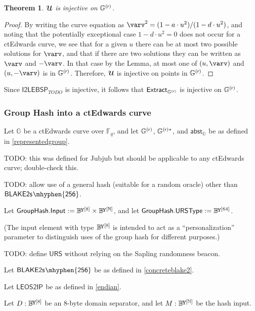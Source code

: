 \documentclass{article}
\newtheorem{theorem}{Theorem}[subsection]
\newcommand{\crossref}[1]{\autoref{#1}}
\newcommand{\typecolon}{:}
\newcommand{\overlap}[2]{\rlap{#2}\hspace{#1}{#2}}
\newcommand{\byte}{\mathbb{B}\kern -0.1em\raisebox{0.48ex}{\overlap{0.0001em}{\scalebox{0.7}{$\mathbb{Y}$}}}}
\newcommand{\Nat}{\mathbb{N}}
\newcommand{\Field}[1]{\mathbb{F}_{\!#1}}
\newcommand{\typeexp}[2]{{#1}\vphantom{)}^{[{#2}]}}
\newcommand{\byteseq}[1]{\typeexp{\byte}{#1}}
\newcommand{\byteseqs}{\byteseq{\Nat}}
\newcommand{\mult}{\cdot}
\newcommand{\BlakeTwos}[1]{\mathsf{BLAKE2s\kern 0.05em\mhyphen{#1}}}
\newcommand{\Selectu}{\scalebox{1.53}{$u$}}
\newcommand{\subgroupr}{(\kern-0.075emr\kern-0.075em)}
\newcommand{\Extract}{\mathsf{Extract}}
\newcommand{\GroupHash}{\mathsf{GroupHash}}
\newcommand{\GroupG}[1]{\mathbb{G}_{#1}}
\newcommand{\SubgroupG}[1]{\GroupG{#1}^{\subgroupr}}
\newcommand{\SubgroupGstar}[1]{\GroupG{#1}^{\subgroupr\ast}}
\newcommand{\abstG}[1]{\abst_{\GroupG{#1}}}
\newcommand{\ExtractG}{\Extract_{\SubgroupG{}}}
\newcommand{\GroupGHashURSType}{\GroupHash\mathsf{.URSType}}
\newcommand{\GroupGHashInput}{\GroupHash\mathsf{.Input}}
\newcommand{\URS}{\mathsf{URS}}
\newcommand{\abst}{\mathsf{abst}}
\newcommand{\ItoLEBSP}[1]{\mathsf{I2LEBSP}_{#1}}
\newcommand{\LEOStoIP}[1]{\mathsf{LEOS2IP}_{#1}}
\begin{document}
\begin{theorem}
$\Selectu$ is injective on $\SubgroupG{}$.
\end{theorem}

\begin{proof}
By writing the curve equation as
$\varv^2 = (1 - a \mult u^2) / (1 - d \mult u^2)$, and noting that the
potentially exceptional case $1 - d \mult u^2 = 0$ does not occur for a
ctEdwards curve, we see that for a given $u$ there can be at
most two possible solutions for $\varv$, and that if there are two solutions
they can be written as $\varv$ and $-\varv$. In that case by the Lemma, at
most one of $(u, \varv)$ and $(u, -\varv)$ is in $\SubgroupG{}$. Therefore,
$\Selectu$ is injective on points in $\SubgroupG{}$.
\end{proof}

Since $\ItoLEBSP{TODO}$ is injective, it follows that $\ExtractG$ is injective
on $\SubgroupG{}$.


\subsubsection{Group Hash into a ctEdwards curve} \label{concreteedwardsgrouphash}

Let $\GroupG{}$ be a ctEdwards curve over $\Field{q}$, and
let $\SubgroupG{}$, $\SubgroupGstar{}$, and $\abstG{}$ be as defined in \crossref{representedgroup}.

TODO: this was defined for Jubjub but should be applicable to any ctEdwards curve;
double-check this.

TODO: allow use of a general hash (suitable for a random oracle) other than
$\BlakeTwos{256}$.

Let $\GroupGHashInput := \byteseq{8} \times \byteseqs$, and
let $\GroupGHashURSType := \byteseq{64}$.

(The input element with type $\byteseq{8}$ is intended to act as a
``personalization'' parameter to distinguish uses of the group hash for
different purposes.)

TODO: define $\URS$ without relying on the Sapling randomness beacon.

Let $\BlakeTwos{256}$ be as defined in \crossref{concreteblake2}.

Let $\LEOStoIP{}$ be as defined in \crossref{endian}.

\vspace{1ex}
Let $D \typecolon \byteseq{8}$ be an $8$-byte domain separator, and
let $M \typecolon \byteseqs$ be the hash input.
\end{document}
